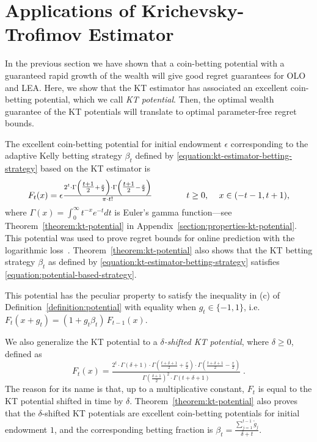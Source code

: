 \section{Applications of Krichevsky-Trofimov Estimator}
\label{section:kt-estimator}

In the previous section we have shown that a coin-betting potential with a
guaranteed rapid growth of the wealth will give good regret guarantees for
\ac{OLO} and \ac{LEA}. Here, we show that the
KT estimator has associated an excellent
coin-betting potential, which we call \emph{KT potential}. 
Then, the optimal wealth guarantee of the KT potentials will translate to optimal parameter-free regret bounds.

The excellent coin-betting potential for initial endowment $\epsilon$
corresponding to the adaptive Kelly betting strategy
$\beta_t$ defined by \eqref{equation:kt-estimator-betting-strategy}
based on the KT estimator is
\begin{equation}
\label{equation:kt-estimator-potential}
F_t(x) = \epsilon \tfrac{2^t \cdot \Gamma \left( \tfrac{t+1}{2} + \frac{x}{2} \right) \cdot \Gamma \left( \tfrac{t+1}{2} - \frac{x}{2} \right)}{\pi \cdot t!}
\qquad \qquad \text{$t \ge 0$, \quad $x \in \left(-t-1, t+1\right)$,}
\end{equation}
where $\Gamma(x) = \int_0^\infty t^{-x} e^{-t} dt$ is Euler's gamma function---see Theorem~\ref{theorem:kt-potential} in
Appendix~\ref{section:properties-kt-potential}.
This potential was used to prove regret bounds for online prediction with the logarithmic loss~\cite{Krichevsky-Trofimov-1981}\cite[Section 9.7]{Cesa-Bianchi-Lugosi-2006}.
Theorem~\ref{theorem:kt-potential}
also shows that the KT betting strategy $\beta_t$ as defined by
\eqref{equation:kt-estimator-betting-strategy} satisfies \eqref{equation:potential-based-strategy}.

This potential has the peculiar property to satisfy the inequality in (c) of Definition~\ref{definition:potential}
with equality when $g_t\in \{-1,1\}$, i.e. $F_t(x+g_t)=(1+g_t \beta_t) \, F_{t-1}(x)$.


We also generalize the KT potential to a \emph{$\delta$-shifted KT
potential}, where $\delta\geq0$, defined as
\[
F_t(x) = \tfrac{2^t \cdot \Gamma\left(\delta + 1 \right) \cdot \Gamma\left(\tfrac{t+\delta+1}{2} + \frac{x}{2} \right) \cdot \Gamma\left(\tfrac{t+\delta+1}{2} - \frac{x}{2} \right)}{\Gamma\left(\tfrac{\delta+1}{2} \right)^2 \cdot \Gamma \left(t+\delta+1\right)} \; .
\]
The reason for its name is that, up to a multiplicative constant, $F_t$ is
equal to the KT potential shifted in time by $\delta$. Theorem~\ref{theorem:kt-potential} also proves that the $\delta$-shifted KT potentials are excellent coin-betting potentials for initial endowment $1$, and the
corresponding betting fraction is $\beta_t = \tfrac{\sum_{j=1}^{t-1} \widetilde g_j}{\delta+t}$.

